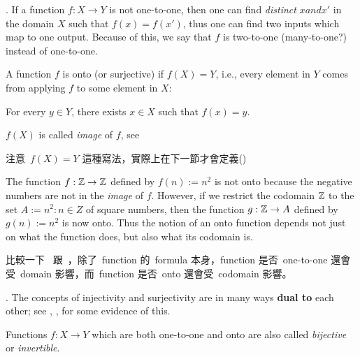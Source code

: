 \begin{remark} \label{remark 3.3.16}.
If a function \(f : X \rightarrow Y\) is not one-to-one, then one can find \emph{distinct} \(x and x'\) in the domain \(X\) such that \(f(x)= f(x')\), thus one can find two inputs which map to one output. Because of this, we say that \(f\) is two-to-one (many-to-one?) instead of one-to-one.
\end{remark}

\begin{definition}  \label{def 3.3.17}
A function \(f\) is onto (or surjective) if \(f(X) = Y\), i.e., every element in \(Y\) comes from applying \(f\) to some element in \(X\):
\begin{center}
    For every \(y \in Y\), there exists \(x \in X\) such that \(f(x) = y\).    
\end{center}
\(f(X)\) is called \emph{image} of \(f\), see 
\end{definition}

\begin{note}
注意\ \(f(X) = Y\) 這種寫法，實際上在下一節才會定義()
\end{note}

\begin{example} [Informal] \label{example 3.3.18}
The function \(f : \mathbb{Z} \rightarrow \mathbb{Z}\) defined by \(f(n) := n^2\) is not onto because the negative numbers are not in the \emph{image} of \(f\). However, if we restrict the codomain \(\mathbb{Z}\) to the set \(A := {n^2 : n \in Z}\) of square numbers, then the function \(g : \mathbb{Z} \rightarrow A\) defined by \(g(n) := n^2\) is now onto. Thus the notion of an onto function depends not just on what the function does, but also what its codomain is.
\end{example}

\begin{note}
比較一下\  跟\ ，除了\ function 的\ formula 本身，function 是否\ one-to-one 還會受\ domain 影響，而\ function 是否\ onto 還會受\ codomain 影響。
\end{note}

\begin{remark} \label{remark 3.3.19}.
The concepts of injectivity and surjectivity are in many ways \textbf{dual to} each other; see , ,  for some evidence of this.
\end{remark}

\begin{definition}  \label{def 3.3.20}
Functions \(f : X \rightarrow Y\) which are both one-to-one and onto are also called \emph{bijective} or \emph{invertible}.
\end{definition}

